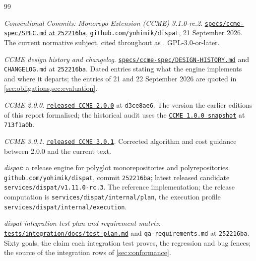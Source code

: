 \begin{thebibliography}{99}

\emph{Conventional Commits: Monorepo Extension (CCME) 3.1.0-rc.2}.
\href{https://github.com/yohimik/dispat/blob/252216bab9bd4052ba181a2ceb47e21363b8eff3/specs/ccme-spec/SPEC.md}{\texttt{specs/ccme-spec/SPEC.md} at \texttt{252216ba}},
\texttt{github.com/yohimik/dispat}, 21 September 2026. The current normative
subject, cited throughout as \SPEC{}. GPL-3.0-or-later.

\emph{CCME design history and changelog}.
\href{https://github.com/yohimik/dispat/blob/252216bab9bd4052ba181a2ceb47e21363b8eff3/specs/ccme-spec/DESIGN-HISTORY.md}{\texttt{specs/ccme-spec/DESIGN-HISTORY.md}}
and \texttt{CHANGELOG.md} at \texttt{252216ba}. Dated entries stating what the
engine implements and where it departs; the entries of 21 and 22 September
2026 are quoted in \cref{sec:obligations,sec:evaluation}.

\emph{CCME 2.0.0}.
\href{https://github.com/yohimik/dispat/blob/d3ce8ae637232908ced82efb5cda550f60ed2fdf/specs/ccme-spec/SPEC.md}{\texttt{released CCME 2.0.0}}
at \texttt{d3ce8ae6}. The version the earlier editions of this report
formalised; the historical audit uses the
\href{https://github.com/yohimik/dispat/blob/713f1a0b/pkg/ccme/SPEC.md}{\texttt{CCME 1.0.0 snapshot}}
at \texttt{713f1a0b}.

\emph{CCME 3.0.1}.
\href{https://github.com/yohimik/dispat/blob/8238e2465670b39609f8dcf5a8a5d34ea71d3db1/specs/ccme-spec/SPEC.md}{\texttt{released CCME 3.0.1}}.
Corrected algorithm and cost guidance between 2.0.0 and the current text.

\emph{dispat}: a release engine for polyglot monorepositories and
polyrepositories. \texttt{github.com/yohimik/dispat}, commit
\texttt{252216ba}; latest released candidate \texttt{services/dispat/v1.11.0-rc.3}.
The reference implementation; the release computation is
\texttt{services/dispat/internal/plan}, the execution profile
\texttt{services/dispat/internal/execution}.

\emph{dispat integration test plan and requirement matrix}.
\href{https://github.com/yohimik/dispat/blob/252216bab9bd4052ba181a2ceb47e21363b8eff3/tests/integration/docs/test-plan.md}{\texttt{tests/integration/docs/test-plan.md}}
and \texttt{qa-requirements.md} at \texttt{252216ba}. Sixty goals, the claim
each integration test proves, the regression and bug fences; the source of the
integration rows of \cref{sec:conformance}.


\end{thebibliography}
